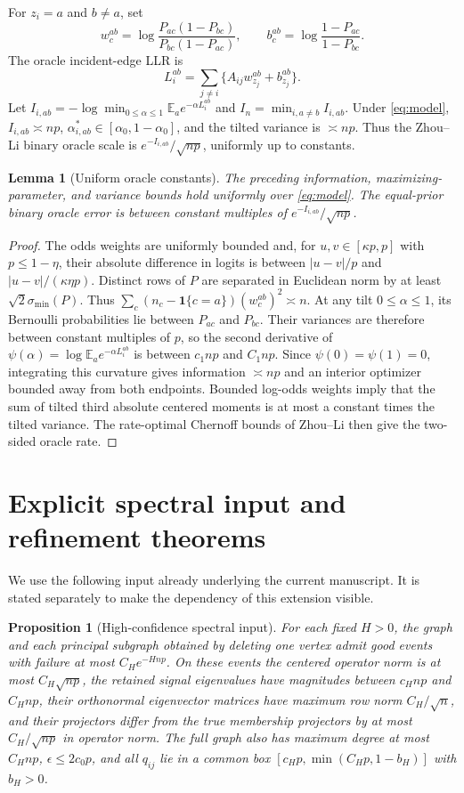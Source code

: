 \documentclass[11pt]{article}
\newtheorem{lemma}[theorem]{Lemma}
\newtheorem{proposition}[theorem]{Proposition}
\newcommand{\E}{\mathbb E}
\newcommand{\one}{\mathbf 1}
\begin{document}
For $z_i=a$ and $b\ne a$, set
\[
 w_c^{ab}=\log\frac{P_{ac}(1-P_{bc})}{P_{bc}(1-P_{ac})},\qquad
 b_c^{ab}=\log\frac{1-P_{ac}}{1-P_{bc}}.
\]
The oracle incident-edge LLR is
\[
 L_i^{ab}=\sum_{j\ne i}\{A_{ij}w_{z_j}^{ab}+b_{z_j}^{ab}\}.
\]
Let $I_{i,ab}=-\log\min_{0\le\alpha\le1}\E_a e^{-\alpha L_i^{ab}}$ and $I_n=\min_{i,a\ne b}I_{i,ab}$. Under \eqref{eq:model}, $I_{i,ab}\asymp np$, $\alpha_{i,ab}^*\in[\alpha_0,1-\alpha_0]$, and the tilted variance is $\asymp np$. Thus the Zhou--Li binary oracle scale is $e^{-I_{i,ab}}/\sqrt{np}$, uniformly up to constants.

\begin{lemma}[Uniform oracle constants]\label{lem:oracle}
The preceding information, maximizing-parameter, and variance bounds hold uniformly over \eqref{eq:model}. The equal-prior binary oracle error is between constant multiples of $e^{-I_{i,ab}}/\sqrt{np}$.
\end{lemma}
\begin{proof}
The odds weights are uniformly bounded and, for $u,v\in[\kappa p,p]$ with $p\le1-\eta$, their absolute difference in logits is between $|u-v|/p$ and $|u-v|/(\kappa\eta p)$. Distinct rows of $P$ are separated in Euclidean norm by at least $\sqrt{2}\sigma_{\min}(P)$. Thus $\sum_c(n_c-\one\{c=a\})(w_c^{ab})^2\asymp n$. At any tilt $0\le\alpha\le1$, its Bernoulli probabilities lie between $P_{ac}$ and $P_{bc}$. Their variances are therefore between constant multiples of $p$, so the second derivative of $\psi(\alpha)=\log\E_a e^{-\alpha L_i^{ab}}$ is between $c_1np$ and $C_1np$. Since $\psi(0)=\psi(1)=0$, integrating this curvature gives information $\asymp np$ and an interior optimizer bounded away from both endpoints. Bounded log-odds weights imply that the sum of tilted third absolute centered moments is at most a constant times the tilted variance. The rate-optimal Chernoff bounds of Zhou--Li then give the two-sided oracle rate.
\end{proof}

\section{Explicit spectral input and refinement theorems}
We use the following input already underlying the current manuscript. It is stated separately to make the dependency of this extension visible.

\begin{proposition}[High-confidence spectral input]\label{prop:input}
For each fixed $H>0$, the graph and each principal subgraph obtained by deleting one vertex admit good events with failure at most $C_H e^{-Hnp}$. On these events the centered operator norm is at most $C_H\sqrt{np}$, the retained signal eigenvalues have magnitudes between $c_Hnp$ and $C_Hnp$, their orthonormal eigenvector matrices have maximum row norm $C_H/\sqrt n$, and their projectors differ from the true membership projectors by at most $C_H/\sqrt{np}$ in operator norm. The full graph also has maximum degree at most $C_Hnp$, $\epsilon\le2c_0p$, and all $q_{ij}$ lie in a common box $[c_Hp,\min(C_Hp,1-b_H)]$ with $b_H>0$.
\end{proposition}
\end{document}
